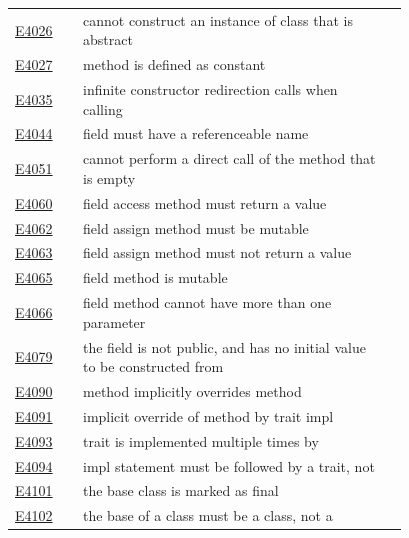 \begin{longtable}{@{}l p{0.78\linewidth} r@{}}
\hyperref[sec:codes:e4026]{E4026} & cannot construct an instance of class \errhole{} that is abstract & \pageref{sec:codes:e4026}\\
\hyperref[sec:codes:e4027]{E4027} & method \errhole{} is defined as constant & \pageref{sec:codes:e4027}\\
\hyperref[sec:codes:e4035]{E4035} & infinite constructor redirection calls when calling \errhole{} & \pageref{sec:codes:e4035}\\
\hyperref[sec:codes:e4044]{E4044} & field must have a referenceable name & \pageref{sec:codes:e4044}\\
\hyperref[sec:codes:e4051]{E4051} & cannot perform a direct call of the method \errhole{} that is empty & \pageref{sec:codes:e4051}\\
\hyperref[sec:codes:e4060]{E4060} & field access method must return a value & \pageref{sec:codes:e4060}\\
\hyperref[sec:codes:e4062]{E4062} & field assign method must be mutable & \pageref{sec:codes:e4062}\\
\hyperref[sec:codes:e4063]{E4063} & field assign method must not return a value & \pageref{sec:codes:e4063}\\
\hyperref[sec:codes:e4065]{E4065} & field method \errhole{} is mutable & \pageref{sec:codes:e4065}\\
\hyperref[sec:codes:e4066]{E4066} & field method cannot have more than one parameter & \pageref{sec:codes:e4066}\\
\hyperref[sec:codes:e4079]{E4079} & the field \errhole{} is not public, and has no initial value to be constructed from & \pageref{sec:codes:e4079}\\
\hyperref[sec:codes:e4090]{E4090} & method \errhole{} implicitly overrides method \errhole{} & \pageref{sec:codes:e4090}\\
\hyperref[sec:codes:e4091]{E4091} & implicit override of method \errhole{} by trait impl & \pageref{sec:codes:e4091}\\
\hyperref[sec:codes:e4093]{E4093} & trait \errhole{} is implemented multiple times by \errhole{} & \pageref{sec:codes:e4093}\\
\hyperref[sec:codes:e4094]{E4094} & impl statement must be followed by a trait, not \errhole{} & \pageref{sec:codes:e4094}\\
\hyperref[sec:codes:e4101]{E4101} & the base class \errhole{} is marked as final & \pageref{sec:codes:e4101}\\
\hyperref[sec:codes:e4102]{E4102} & the base of a class must be a class, not a \errhole{} & \pageref{sec:codes:e4102}\\

\end{longtable}
